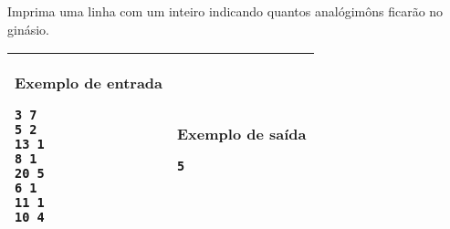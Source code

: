 Imprima uma linha com um inteiro indicando quantos analógimôns
ficarão no ginásio.

\begin{table}[!h]
\centering
\begin{tabular}{|l|l|}
\hline
\begin{minipage}[t]{3in}
\textbf{Exemplo de entrada}
\begin{verbatim}
3 7
5 2
13 1
8 1
20 5
6 1
11 1
10 4
\end{verbatim}
\vspace{1mm}
\end{minipage}
&

\begin{minipage}[t]{3in}
\textbf{Exemplo de saída}
\begin{verbatim}
5
\end{verbatim}
\vspace{1mm}
\end{minipage} \\
\hline
\end{tabular}
\end{table}
